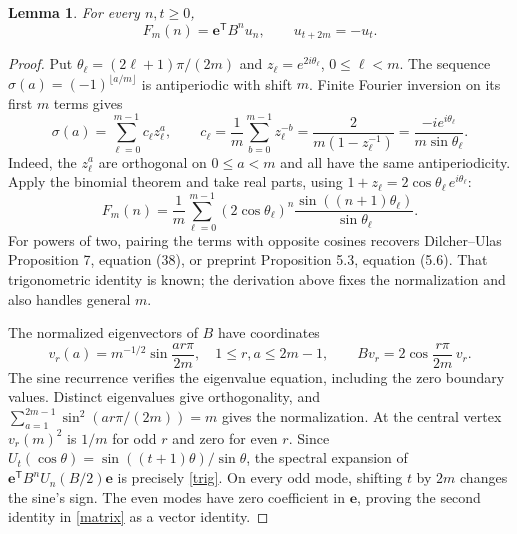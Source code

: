 \documentclass[11pt]{article}
\newtheorem{lemma}{Lemma}
\newcommand{\e}{\mathbf e}
\begin{document}
\begin{lemma}\label{spectral}
For every $n,t\ge0$,
\begin{equation}\label{matrix}
 F_m(n)=\e^{\mathsf T}B^n u_n,
 \qquad u_{t+2m}=-u_t.
\end{equation}
\end{lemma}
\begin{proof}
Put $\theta_\ell=(2\ell+1)\pi/(2m)$ and
$z_\ell=e^{2i\theta_\ell}$, $0\le\ell<m$.
The sequence $\sigma(a)=(-1)^{\lfloor a/m\rfloor}$ is
antiperiodic with shift $m$. Finite Fourier inversion on its first
$m$ terms gives
\[
 \sigma(a)=\sum_{\ell=0}^{m-1}c_\ell z_\ell^a,
 \qquad c_\ell=\frac1m\sum_{b=0}^{m-1}z_\ell^{-b}
 =\frac{2}{m(1-z_\ell^{-1})}
 =\frac{-i e^{i\theta_\ell}}{m\sin\theta_\ell}.
\]
Indeed, the $z_\ell^a$ are orthogonal on $0\le a<m$ and all
have the same antiperiodicity. Apply the binomial theorem and take
real parts, using $1+z_\ell=2\cos\theta_\ell\,e^{i\theta_\ell}$:
\begin{equation}\label{trig}
 F_m(n)=\frac1m\sum_{\ell=0}^{m-1}
 (2\cos\theta_\ell)^n
 \frac{\sin((n+1)\theta_\ell)}{\sin\theta_\ell}.
\end{equation}
For powers of two, pairing the terms with opposite cosines recovers
Dilcher--Ulas Proposition 7, equation (38), or preprint
Proposition 5.3, equation (5.6). That trigonometric identity is known;
the derivation above fixes the normalization and also handles general $m$.

The normalized eigenvectors of $B$ have coordinates
\[
 v_r(a)=m^{-1/2}\sin\frac{ar\pi}{2m},\quad
 1\le r,a\le2m-1,
 \qquad Bv_r=2\cos\frac{r\pi}{2m}\,v_r.
\]
The sine recurrence verifies the eigenvalue equation, including the
zero boundary values. Distinct eigenvalues give orthogonality, and
$\sum_{a=1}^{2m-1}\sin^2(ar\pi/(2m))=m$ gives the normalization.
At the central vertex $v_r(m)^2$ is $1/m$ for odd $r$ and zero
for even $r$. Since $U_t(\cos\theta)=\sin((t+1)\theta)/\sin\theta$,
the spectral expansion of $\e^{\mathsf T}B^nU_n(B/2)\e$
is precisely \eqref{trig}.
On every odd mode, shifting $t$ by $2m$ changes the sine's sign.
The even modes have zero coefficient in $\e$, proving the second
identity in \eqref{matrix} as a vector identity.
\end{proof}
\end{document}
